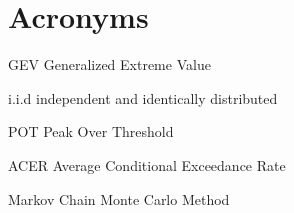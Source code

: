 
\chapter{Acronyms}
\begin{description}
\item{GEV} Generalized Extreme Value
\item{i.i.d} independent and identically distributed
\item{POT} Peak Over Threshold
\item{ACER} Average Conditional Exceedance Rate
\item[MCMC] Markov Chain Monte Carlo Method
\end{description}
